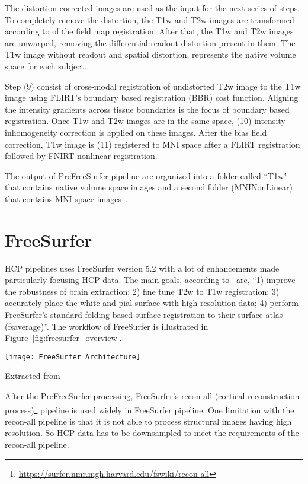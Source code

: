 \indent The distortion corrected images are used as the input for the next series of steps. To completely remove the distortion, the T1w and T2w images are transformed according to of the field map registration. After that, the T1w and T2w images are unwarped, removing the differential readout distortion present in them. The T1w image without readout and spatial distortion, represents the native volume space for each subject.

\indent Step (9) consist of cross-modal registration of undistorted T2w image to the T1w image using FLIRT's boundary based registration (BBR) cost function. Aligning the intensity gradients across tissue boundaries is the focus of boundary based registration. Once T1w and T2w images are in the same space, (10) intensity inhomogeneity correction is applied on these images. After the bias field correction, T1w image is (11) registered to MNI space after a FLIRT registration followed by FNIRT nonlinear registration.

\indent The output of PreFreeSurfer pipeline are organized into a folder called ``T1w" that contains native volume space images and a second folder (MNINonLinear) that contains MNI space images~\cite{Gla13}.

\section{FreeSurfer} \label{sec:FreeSurfer}
HCP pipelines uses FreeSurfer version 5.2 with a lot of enhancements made particularly focusing HCP data. The main goals, according to~\cite{Gla13} are, ``1) improve the robustness of brain extraction; 2) fine tune T2w to T1w registration; 3) accurately place the white and pial surface with high resolution data; 4) perform FreeSurfer's standard folding-based surface registration to their surface atlas (fsaverage)''. The workflow of FreeSurfer is illustrated in Figure~\ref{fig:freesurfer_overview}.

\begin{center}
  \texttt{[image: FreeSurfer\_Architecture]}
  \label{fig:freesurfer_overview}
  \caption*{Extracted from \cite{Gla13}}
\end{center}

After the PreFreeSurfer processing, FreeSurfer's recon-all (cortical reconstruction process)\footnote{\url{https://surfer.nmr.mgh.harvard.edu/fswiki/recon-all}} pipeline is used widely in FreeSurfer pipeline. One limitation with the recon-all pipeline is that it is not able to process structural images having high resolution. So HCP data has to be downsampled to meet the requirements of the recon-all pipeline.

